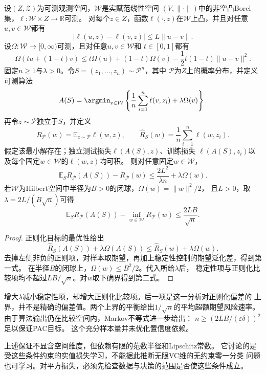 \begin{theorem}[正则化学习的期望风险保证]
\label{thm:regularized-learning-risk}
设$(Z,\mathcal Z)$为可测观测空间，$\mathcal W$是实赋范线性空间
$(V,\|\cdot\|)$中的非空凸Borel集，$\ell:\mathcal W\times Z\to\mathbb R$可测。
对每个$z\in Z$，函数$\ell(\cdot,z)$在$\mathcal W$上凸，并且对任意
$u,v\in\mathcal W$都有
\[
 |\ell(u,z)-\ell(v,z)|\leq L\|u-v\|.
\]
设$\Omega:\mathcal W\to[0,\infty)$可测，且对任意$u,v\in\mathcal W$和
$t\in[0,1]$都有
\[
 \Omega(tu+(1-t)v)
 \leq t\Omega(u)+(1-t)\Omega(v)-\frac12t(1-t)\|u-v\|^2.
\]
固定$n\geq1$与$\lambda>0$。令$S=(z_1,\ldots,z_n)\sim\mathcal P^n$，其中
$\mathcal P$为$Z$上的概率分布，并定义可测算法
\[
 A(S)=\argmin_{v\in\mathcal W}
 \left\{\frac1n\sum_{i=1}^n\ell(v,z_i)+\lambda\Omega(v)\right\}.
\]
再令$z\sim\mathcal P$独立于$S$，并定义
\[
 R_{\mathcal P}(w)=\mathbb E_{z\sim\mathcal P}\ell(w,z),
 \qquad
 \hat R_S(w)=\frac1n\sum_{i=1}^n\ell(w,z_i).
\]
假定该最小解存在；独立测试损失$\ell(A(S),z)$、训练损失
$\ell(A(S),z_i)$以及每个固定$w\in\mathcal W$的$\ell(w,z)$均可积。
则对任意固定$w\in\mathcal W$，
\begin{equation}
 \mathbb E_S R_{\mathcal P}(A(S))-R_{\mathcal P}(w)
 \leq\frac{2L^2}{\lambda n}+\lambda\Omega(w).
 \label{eq:regularization-excess-risk}
\end{equation}
若$\mathcal W$为Hilbert空间中半径为$B>0$的闭球，$\Omega(w)=\|w\|^2/2$，
且$L>0$，取$\lambda=2L/(B\sqrt n)$可得
\[
 \mathbb E_S R_{\mathcal P}(A(S))-\inf_{w\in\mathcal W}R_{\mathcal P}(w)
 \leq\frac{2LB}{\sqrt n}.
\]
\end{theorem}
\begin{proof}
正则化目标的最优性给出
\[
 \hat R_S(A(S))+\lambda\Omega(A(S))
 \leq\hat R_S(w)+\lambda\Omega(w).
\]
去掉左侧非负的正则项，对样本取期望，再加上稳定性控制的期望泛化差，得到第一式。
在半径$B$的闭球上，$\Omega(w)\leq B^2/2$。代入所给$\lambda$后，
稳定性项与正则化比较项均不超过$LB/\sqrt n$。对$w$取下确界得到第二式。
\end{proof}

增大$\lambda$减小稳定性项，却增大正则化比较项。后一项是这一分析对正则化偏差的
上界，并不是精确的偏差值。两个上界的平衡给出$1/\sqrt n$的平均超额期望风险速率。
由于算法输出仍在比较空间内，Markov不等式进一步给出：
$n\geq(2LB/(\varepsilon\delta))^2$足以保证PAC目标。
这个充分样本量并未优化置信度依赖。

上述保证不显含空间维度，但依赖有限的范数半径和Lipschitz常数。
它讨论的是受这些条件约束的实值损失学习，不能据此推断无限VC维的无约束零一分类
问题也可学习。对平方损失，必须先检查数据与决策的范围是否使这些条件成立。

